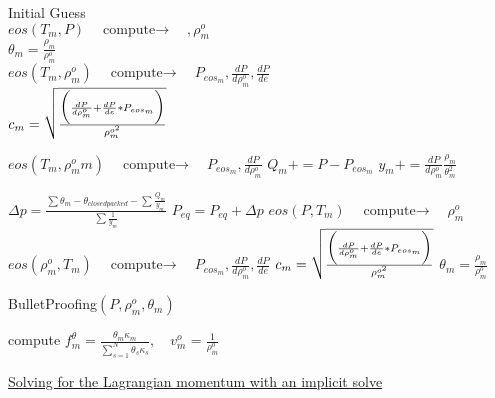 \documentclass[fleqn]{article}
\newcommand{\SUM}[1]    {\ensuremath{\sum \limits_{{#1}=1}^N }}
\newcommand{\B}[1]      {\biggr{#1}}
\newcommand{\rhoM}      {\ensuremath{\rho^{o}_m}}
\newcommand{\f}         {\ensuremath{f^{\theta}_m} }
\newcommand{\sv}[1]     {\ensuremath{v^o_{m_{#1}} }}
\newcommand{\dpdrho}    {\ensuremath{ \frac{dP}{d\rhoM}} }
\newcommand{\compute}   {\ensuremath{\quad{\text{compute}\rightarrow}\quad}}
\begin{document}
\begin{algorithmic}
\STATE Initial Guess \\
  $eos(T_m, P)  \compute ,\rhoM$ \\
  $\theta_m = \frac{\rho_m}{\rhoM}$  \\
  $eos(T_m, \rhoM)  \compute P_{{eos}_m}, \dpdrho, \frac{dP}{de}$ \\ 
  $c_m =  \sqrt{ \frac {\B{(} \dpdrho + \frac{dP}{de} * P_{{eos}_m } \B{)}} {\rho^{o^2}_m} }$
%
    
      \STATE  $eos(T_m,\rhoM{m})  \compute P_{eos_{m}}, \dpdrho$
      \STATE $Q_m += P- P_{{eos}_m}$
      \STATE $y_m  += \dpdrho \frac{\rho_m}{\theta_m^2}$
    \ENDFOR

    \STATE $\Delta p = \frac{  \sum{\theta_m} - \theta_{closedpacked} - \sum{\frac{Q_m}{y_m}}  }{\sum{\frac{1}{y_m}} } $
    \STATE $P_{eq}=P_{eq}+ \Delta p $
%
      \STATE $ eos(P, T_m) \compute  \rhoM$ 
      \STATE $ eos(\rhoM, T_m) \compute   P_{{eos}_m}, \dpdrho, \frac{dP}{de}$ 
      \STATE $c_m = \sqrt{ \frac {\B{(}\dpdrho + \frac{dP}{de} * P_{{eos}_m } \B{)}} {\rho^{o^2}_m} }$
      \STATE $ \theta_m =  \frac{\rho_m}{\rhoM}$
    \ENDFOR

\ENDWHILE 
\STATE BulletProofing$(P, \rhoM, \theta_m) $

\STATE compute $  \f = \frac{\theta_m \kappa_m}{\SUM{s}{\theta_s \kappa_s}},  \quad\sv{} = \frac {1}{\rhoM}$
\end{algorithmic}

\newpage
\underline{Solving for the Lagrangian momentum with an implicit solve}
\end{document}

